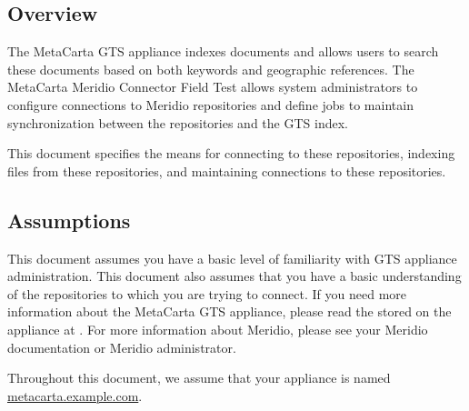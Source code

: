 %
%

\begin{changemargin}{1.5in}{0in}

\section{Overview}

The MetaCarta GTS appliance indexes documents and allows users to
search these documents based on both keywords and geographic
references. The MetaCarta Meridio Connector Field Test allows system
administrators to configure connections to Meridio repositories and
define jobs to maintain synchronization between the repositories and
the GTS index.

This document specifies the means for connecting to these repositories,
indexing files from these repositories, and maintaining connections to
these repositories.

\subsection{Assumptions}

This document assumes you have a basic level of familiarity with GTS
appliance administration. This document also assumes that you have
a basic understanding of the repositories to which you are trying to
connect. If you need more information about the MetaCarta GTS appliance,
please read the  stored
on the appliance at . For
more information about Meridio, please see your Meridio documentation
or Meridio administrator.

Throughout this document, we assume that your appliance is named \\
\url{metacarta.example.com}. 


\end{changemargin}
